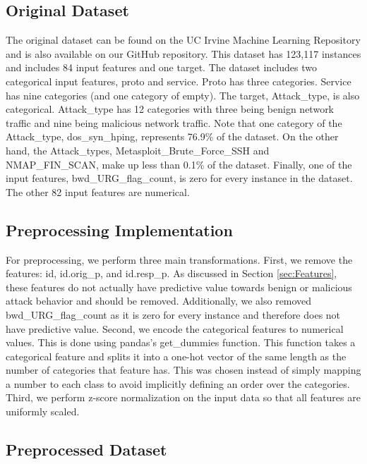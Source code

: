 \documentclass[11pt]{article}
\begin{document}
\subsection{Original Dataset}

The original dataset can be found on the UC Irvine Machine Learning Repository \citep{ref2} and is also available on our GitHub repository. This dataset has 123,117 instances and includes 84 input features and one target. The dataset includes two categorical input features, proto and service. Proto has three categories. Service has nine categories (and one category of empty). The target, Attack\_type, is also categorical. Attack\_type has 12 categories with three being benign network traffic and nine being malicious network traffic. Note that one category of the Attack\_type, dos\_syn\_hping, represents 76.9\% of the dataset. On the other hand, the Attack\_types, Metasploit\_Brute\_Force\_SSH and NMAP\_FIN\_SCAN, make up less than 0.1\% of the dataset. Finally, one of the input features, bwd\_URG\_flag\_count, is zero for every instance in the dataset. The other 82 input features are numerical.

\subsection{Preprocessing Implementation}
\label{sec:Preprocessing}

For preprocessing, we perform three main transformations. First, we remove the features: id, id.orig\_p, and id.resp\_p. As discussed in Section \ref{sec:Features}, these features do not actually have predictive value towards benign or malicious attack behavior and should be removed. Additionally, we also removed bwd\_URG\_flag\_count as it is zero for every instance and therefore does not have predictive value. Second, we encode the categorical features to numerical values. This is done using pandas’s get\_dummies function. This function takes a categorical feature and splits it into a one-hot vector of the same length as the number of categories that feature has. This was chosen instead of simply mapping a number to each class to avoid implicitly defining an order over the categories. Third, we perform z-score normalization on the input data so that all features are uniformly scaled.

\subsection{Preprocessed Dataset}
\end{document}
